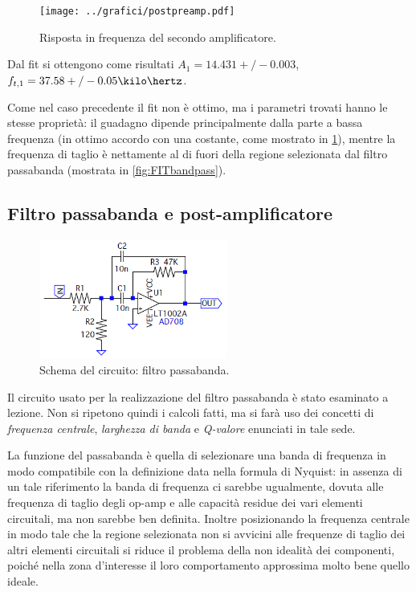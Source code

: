 \documentclass[a4paper,10pt]{article}
\begin{document}
\vspace*{-8pt}
\begin{figure}[H]
	\centering
	\texttt{[image: ../grafici/postpreamp.pdf]}
	\vspace*{-10pt}
	\caption{Risposta in frequenza del secondo amplificatore.}
	\label{fig:postpreamp}
\end{figure}
\vspace*{-10pt}

Dal fit si ottengono come risultati $A_1 = 14.431+/-0.003$, $f_{t,1} = 37.58+/-0.05 \kilo\hertz$.

Come nel caso precedente il fit non è ottimo, ma i parametri trovati hanno le stesse proprietà: il guadagno dipende principalmente dalla parte a bassa frequenza (in ottimo accordo con una costante, come mostrato in \cref{fig:postpreamp}), mentre la frequenza di taglio è nettamente al di fuori della regione selezionata dal filtro passabanda (mostrata in \cref{fig:FITbandpass}).

\subsection{Filtro passabanda e post-amplificatore}
\label{sec:bandpass}

\begin{figure}
	\vspace{-10pt}
	\centering
	\includegraphics[width=0.55\textwidth]{../grafici/Bandpass.png}
	\vspace{-12pt}
	\caption{Schema del circuito: filtro passabanda.}
	\label{fig:bandpass}
	\vspace{-6pt}
\end{figure}

Il circuito usato per la realizzazione del filtro passabanda è stato esaminato a lezione. Non si ripetono quindi i calcoli fatti, ma si farà uso dei concetti di \textit{frequenza centrale}, \textit{larghezza di banda} e \textit{Q-valore} enunciati in tale sede.

La funzione del passabanda è quella di selezionare una banda di frequenza in modo compatibile con la definizione data nella formula di Nyquist: in assenza di un tale riferimento la banda di frequenza ci sarebbe ugualmente, dovuta alle frequenza di taglio degli op-amp e alle capacità residue dei vari elementi circuitali, ma non sarebbe ben definita.
Inoltre posizionando la frequenza centrale in modo tale che la regione selezionata non si avvicini alle frequenze di taglio dei altri elementi circuitali si riduce il problema della non idealità dei componenti, poiché nella zona d'interesse il loro comportamento approssima molto bene quello ideale.
\newline
\end{document}
